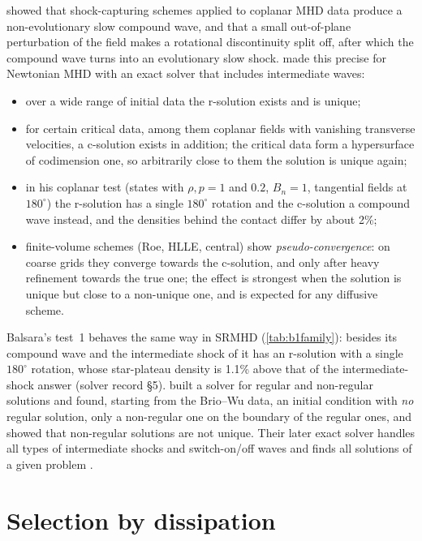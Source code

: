 \documentclass[11pt,a4paper,oneside,openany]{book}
\newcommand{\textcite}{\citet}
\newcommand{\parencite}{\citep}
\theoremstyle{definition}
\theoremstyle{plain}
\theoremstyle{remark}
\begin{document}
\textcite{Barmin1996} showed that shock-capturing schemes applied to coplanar MHD data
produce a non-evolutionary slow compound wave, and that a small out-of-plane perturbation
of the field makes a rotational discontinuity split off, after which the compound wave
turns into an evolutionary slow shock. \textcite{Torrilhon2003jpp,Torrilhon2003jcp} made
this precise for Newtonian MHD with an exact solver that includes intermediate waves:
\begin{itemize}[nosep]
\item over a wide range of initial data the r-solution exists and is unique;
\item for certain critical data, among them coplanar fields with vanishing transverse
  velocities, a c-solution exists in addition; the critical data form a hypersurface of
  codimension one, so arbitrarily close to them the solution is unique again;
\item in his coplanar test (states with $\rho,p=1$ and $0.2$, $B_n=1$, tangential fields at
  $180^\circ$) the r-solution has a single $180^\circ$ rotation and the c-solution a compound
  wave instead, and the densities behind the contact differ by about 2\%;
\item finite-volume schemes (Roe, HLLE, central) show \emph{pseudo-convergence}: on coarse
  grids they converge towards the c-solution, and only after heavy refinement towards the
  true one; the effect is strongest when the solution is unique but close to a non-unique
  one, and is expected for any diffusive scheme.
\end{itemize}
Balsara's test~1 behaves the same way in SRMHD (\cref{tab:b1family}): besides its compound
wave and the intermediate shock of \textcite{GiacomazzoRezzolla2006} it has an r-solution
with a single $180^\circ$ rotation, whose star-plateau density is 1.1\% above that of the
intermediate-shock answer (solver record \S5).
\textcite{TakahashiYamada2013} built a solver for regular and non-regular solutions and
found, starting from the Brio--Wu data, an initial condition with \emph{no} regular solution,
only a non-regular one on the boundary of the regular ones, and showed that non-regular
solutions are not unique. Their later exact solver handles all types of intermediate shocks
and switch-on/off waves and finds all solutions of a given problem
\parencite{TakahashiYamada2014}.

\section{Selection by dissipation}
\end{document}
